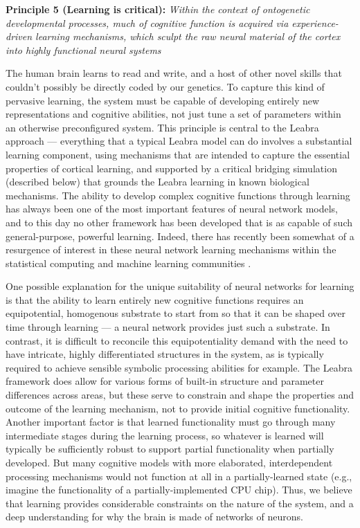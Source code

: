 \documentclass[11pt,twoside]{article}
\begin{document}
{\bf Principle 5 (Learning is critical):} {\em Within the context of
  ontogenetic developmental processes, much of cognitive function is acquired
  via experience-driven learning mechanisms, which sculpt the raw neural
  material of the cortex into highly functional neural systems}

The human brain learns to read and write, and a host of other novel skills
that couldn't possibly be directly coded by our genetics.  To capture this
kind of pervasive learning, the system must be capable of developing entirely
new representations and cognitive abilities, not just tune a set of parameters
within an otherwise preconfigured system.  This principle is central to the
Leabra approach --- everything that a typical Leabra model can do involves a
substantial learning component, using mechanisms that are intended to capture
the essential properties of cortical learning, and supported by a critical
bridging simulation (described below) that grounds the Leabra learning in
known biological mechanisms.  The ability to develop complex cognitive
functions through learning has always been one of the most important features
of neural network models, and to this day no other framework has been
developed that is as capable of such general-purpose, powerful learning.
Indeed, there has recently been somewhat of a resurgence of interest in these
neural network learning mechanisms within the statistical computing and
machine learning communities \cite{HintonSalakhutdinov06,CiresanMeierGambardellaEtAl10,KollerFriedman09}.  

One possible explanation for the unique suitability of neural networks for
learning is that the ability to learn entirely new cognitive functions
requires an equipotential, homogenous substrate to start from so that it can
be shaped over time through learning --- a neural network provides just such a
substrate.  In contrast, it is difficult to reconcile this equipotentiality
demand with the need to have intricate, highly differentiated structures in
the system, as is typically required to achieve sensible symbolic processing
abilities for example.  The Leabra framework does allow for various forms of
built-in structure and parameter differences across areas, but these serve to
constrain and shape the properties and outcome of the learning mechanism, not
to provide initial cognitive functionality.  Another important factor is that
learned functionality must go through many intermediate stages during the
learning process, so whatever is learned will typically be sufficiently robust
to support partial functionality when partially developed.  But many cognitive
models with more elaborated, interdependent processing mechanisms would not
function at all in a partially-learned state (e.g., imagine the functionality
of a partially-implemented CPU chip).  Thus, we believe that learning provides
considerable constraints on the nature of the system, and a deep understanding
for why the brain is made of networks of neurons.
\end{document}
